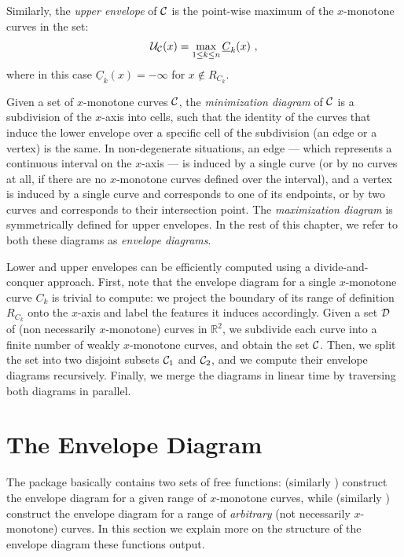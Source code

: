 Similarly, the {\em upper envelope} of ${\cal C}$ is the point-wise maximum of
the $x$-monotone curves in the set:
\begin{eqnarray*}
{\cal U}_{{\cal C}} (x) = \max_{1 \leq k \leq n}{\underline{C}_k (x)} \ ,
\end{eqnarray*}
where in this case $\underline{C}_k(x) = -\infty$ for $x 
\not\in R_{C_k}$.

Given a set of $x$-monotone curves ${\cal C}$, the {\em minimization
diagram} of ${\cal C}$ is a subdivision of the $x$-axis into cells,
such that the identity of the curves that induce the lower envelope
over a specific cell of the subdivision (an edge or a vertex) is the
same. In non-degenerate situations, an edge --- which represents a
continuous interval on the $x$-axis --- is induced by a single
curve (or by no curves at all, if there are no $x$-monotone curves
defined over the interval), and a vertex is induced by a single curve
and corresponds to one of its endpoints, or by two curves and
corresponds to their intersection point.
The {\em maximization diagram} is symmetrically defined for upper envelopes.
In the rest of this chapter, we refer to both these diagrams as
{\em envelope diagrams}.

Lower and upper envelopes can be efficiently computed using a
divide-and-conquer approach. First, note that the envelope diagram for
a single $x$-monotone curve $C_k$ is trivial to compute: we project
the boundary of its range of definition $R_{C_k}$ onto the $x$-axis
and label the features it induces accordingly. Given a set
${\cal D}$ of (non necessarily $x$-monotone) curves in ${\mathbb R}^2$,
we subdivide each curve into a finite number of weakly $x$-monotone 
curves, and obtain the set ${\cal C}$. Then, we split the set into two
disjoint subsets ${\cal C}_1$ and ${\cal C}_2$, and we compute their envelope
diagrams recursively. Finally, we merge the diagrams in linear time by
traversing both diagrams in parallel.

\section{The Envelope Diagram\label{env2_sec:env_diag}}

The package basically contains two sets of free functions:
 (similarly
 ) construct the envelope diagram
for a given range of $x$-monotone curves, while 
 (similarly
) construct the envelope diagram for a
range of {\em arbitrary} (not necessarily $x$-monotone) curves.
In this section we explain more on the structure of the envelope
diagram these functions output.


